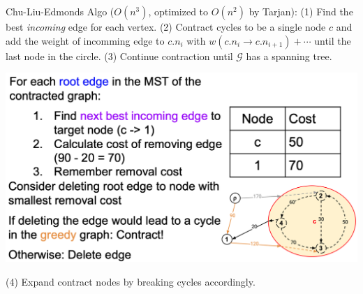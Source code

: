 Chu-Liu-Edmonds Algo ($O(n^3)$, optimized to $O(n^2)$ by Tarjan): \quad
(1) Find the best \emph{incoming} edge for each vertex. 
(2) Contract cycles to be a single node $c$ and add  the weight of incomming edge to $c.n_{i}$ with $w(c.n_{i}\to c.n_{i+1})+\cdots$ until the last node in the circle. 
(3) Continue contraction until $\mathcal{G}$ has a spanning tree. 

\vspace{-0.4cm}
\begin{center}
    \includegraphics[width=\columnwidth]{img/root-remove.png}
\end{center}
\vspace{-0.5cm}

(4) Expand contract nodes by breaking cycles accordingly.

